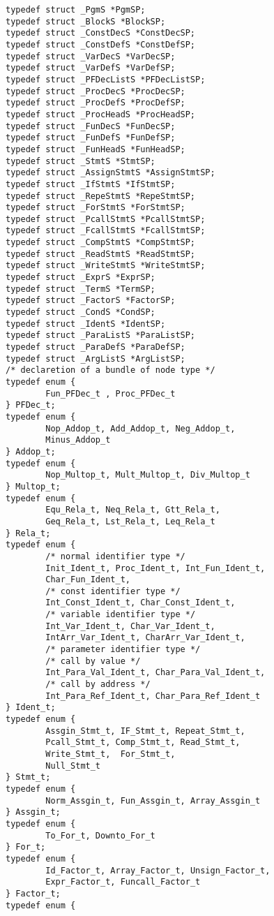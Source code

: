 \begin{verbatim}
typedef struct _PgmS *PgmSP;
typedef struct _BlockS *BlockSP;
typedef struct _ConstDecS *ConstDecSP;
typedef struct _ConstDefS *ConstDefSP;
typedef struct _VarDecS *VarDecSP;
typedef struct _VarDefS *VarDefSP;
typedef struct _PFDecListS *PFDecListSP;
typedef struct _ProcDecS *ProcDecSP;
typedef struct _ProcDefS *ProcDefSP;
typedef struct _ProcHeadS *ProcHeadSP;
typedef struct _FunDecS *FunDecSP;
typedef struct _FunDefS *FunDefSP;
typedef struct _FunHeadS *FunHeadSP;
typedef struct _StmtS *StmtSP;
typedef struct _AssignStmtS *AssignStmtSP;
typedef struct _IfStmtS *IfStmtSP;
typedef struct _RepeStmtS *RepeStmtSP;
typedef struct _ForStmtS *ForStmtSP;
typedef struct _PcallStmtS *PcallStmtSP;
typedef struct _FcallStmtS *FcallStmtSP;
typedef struct _CompStmtS *CompStmtSP;
typedef struct _ReadStmtS *ReadStmtSP;
typedef struct _WriteStmtS *WriteStmtSP;
typedef struct _ExprS *ExprSP;
typedef struct _TermS *TermSP;
typedef struct _FactorS *FactorSP;
typedef struct _CondS *CondSP;
typedef struct _IdentS *IdentSP;
typedef struct _ParaListS *ParaListSP;
typedef struct _ParaDefS *ParaDefSP;
typedef struct _ArgListS *ArgListSP;
/* declaretion of a bundle of node type */
typedef enum { 
        Fun_PFDec_t , Proc_PFDec_t 
} PFDec_t;
typedef enum {
        Nop_Addop_t, Add_Addop_t, Neg_Addop_t,
        Minus_Addop_t 
} Addop_t;
typedef enum { 
        Nop_Multop_t, Mult_Multop_t, Div_Multop_t 
} Multop_t;
typedef enum { 
        Equ_Rela_t, Neq_Rela_t, Gtt_Rela_t, 
        Geq_Rela_t, Lst_Rela_t, Leq_Rela_t 
} Rela_t;
typedef enum { 
        /* normal identifier type */
        Init_Ident_t, Proc_Ident_t, Int_Fun_Ident_t, 
        Char_Fun_Ident_t,
        /* const identifier type */
        Int_Const_Ident_t, Char_Const_Ident_t,
        /* variable identifier type */
        Int_Var_Ident_t, Char_Var_Ident_t,
        IntArr_Var_Ident_t, CharArr_Var_Ident_t,
        /* parameter identifier type */
        /* call by value */
        Int_Para_Val_Ident_t, Char_Para_Val_Ident_t,
        /* call by address */
        Int_Para_Ref_Ident_t, Char_Para_Ref_Ident_t
} Ident_t;
typedef enum { 
        Assgin_Stmt_t, IF_Stmt_t, Repeat_Stmt_t,
        Pcall_Stmt_t, Comp_Stmt_t, Read_Stmt_t,
        Write_Stmt_t,  For_Stmt_t, 
        Null_Stmt_t 
} Stmt_t;
typedef enum { 
        Norm_Assgin_t, Fun_Assgin_t, Array_Assgin_t 
} Assgin_t;
typedef enum { 
        To_For_t, Downto_For_t 
} For_t;
typedef enum { 
        Id_Factor_t, Array_Factor_t, Unsign_Factor_t,
        Expr_Factor_t, Funcall_Factor_t 
} Factor_t;
typedef enum { 

\end{verbatim}
